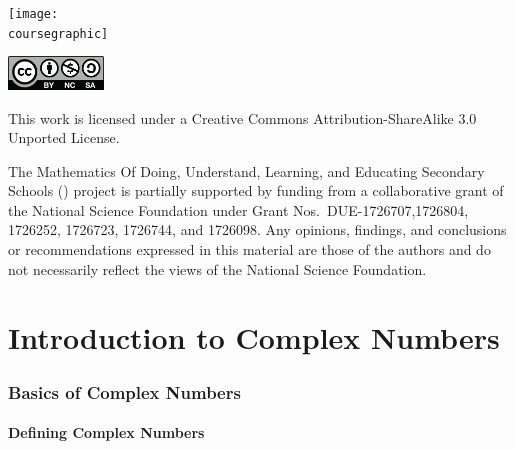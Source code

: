 \documentclass[11pt]{article}
\theoremstyle{definition}
\begin{document}
\maketitle
\ifthenelse{\equal{\coursegraphic}{}} %
	{}
	{\begin{center}\texttt{[image: \\coursegraphic]}\end{center}}
	
\vfill 
\begin{center} \includegraphics[width=1in]{by-nc-sa.png} \end{center}
\footnotesize{ This work is licensed under a Creative Commons Attribution-ShareAlike 3.0 Unported License. }

\footnotesize{
The Mathematics Of Doing, Understand, Learning, and Educating Secondary Schools (\MODULES) project is partially supported by funding from a collaborative grant of the National Science Foundation under Grant Nos.~DUE-1726707,1726804, 1726252, 1726723, 1726744, and 1726098.  Any opinions, findings, and conclusions or recommendations expressed in this material are those of the authors and do not necessarily reflect the views of the National Science Foundation.}
\newpage
\thispagestyle{plain}   
\listoftodos
\tableofcontents
\newpage {}
\newpage 

\part{Introduction to Complex Numbers}

\section{Basics of Complex Numbers}

\subsection{Defining Complex Numbers}
\end{document}
